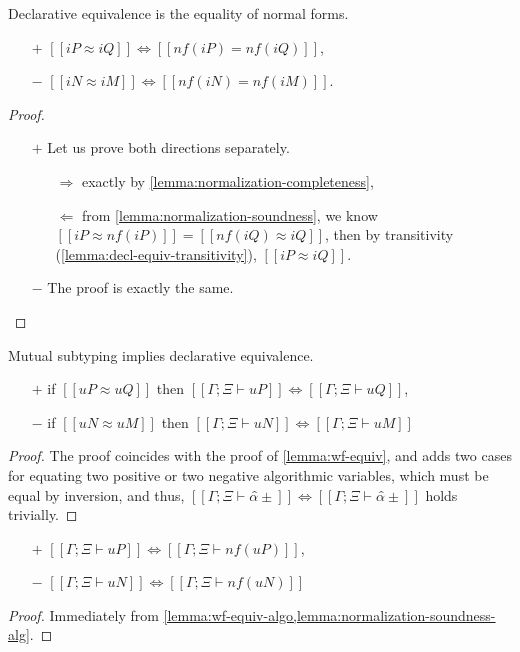 \begin{lemma}
  \label{lemma:decl-equiv-algorithmization}
  Declarative equivalence is the equality of normal forms. 
  \begin{itemize}
    \item[$+$] $[[iP ≈ iQ]] \iff [[nf(iP) = nf(iQ)]]$,
    \item[$-$] $[[iN ≈ iM]] \iff [[nf(iN) = nf(iM)]]$.
  \end{itemize}
\end{lemma}
\begin{proof} \hfill
  \begin{itemize}
    \item[$+$] Let us prove both directions separately.
    \begin{itemize}
      \item[$\Rightarrow$] 
        exactly by \cref{lemma:normalization-completeness},
      \item[$\Leftarrow$] 
        from \cref{lemma:normalization-soundness}, we know
        $[[iP ≈ nf(iP)]] = [[nf(iQ) ≈ iQ]]$, then by transitivity (\cref{lemma:decl-equiv-transitivity}),
        $[[iP ≈ iQ]]$.
    \end{itemize}
    \item[$-$] The proof is exactly the same.
  \end{itemize}
\end{proof}

\begin{lemma}
  \label{lemma:wf-equiv-algo}
  Mutual subtyping implies declarative equivalence.
  \begin{itemize}
  \item[$+$] if $[[uP ≈ uQ]]$ then $[[Γ; Ξ ⊢ uP]] \iff [[Γ; Ξ ⊢ uQ]]$,
  \item[$-$] if $[[uN ≈ uM]]$ then $[[Γ; Ξ ⊢ uN]] \iff [[Γ; Ξ ⊢ uM]]$
  \end{itemize}
\end{lemma}
\begin{proof}
  The proof coincides with the proof of \cref{lemma:wf-equiv},
  and adds two cases for equating two positive or two negative algorithmic variables,
  which must be equal by inversion, and thus, 
  $[[Γ; Ξ ⊢ α̂±]] \iff [[Γ; Ξ  ⊢ α̂±]]$ holds trivially.
\end{proof}

\begin{corollary}
  \label{corollary:wf-nf-algo}
  \begin{itemize}
    \item[$+$] $[[Γ; Ξ ⊢ uP]] \iff [[Γ; Ξ ⊢ nf(uP)]]$,
    \item[$-$] $[[Γ; Ξ ⊢ uN]] \iff [[Γ; Ξ ⊢ nf(uN)]]$
  \end{itemize}
\end{corollary}
\begin{proof}
  Immediately from \cref{lemma:wf-equiv-algo,lemma:normalization-soundness-alg}.
\end{proof}

